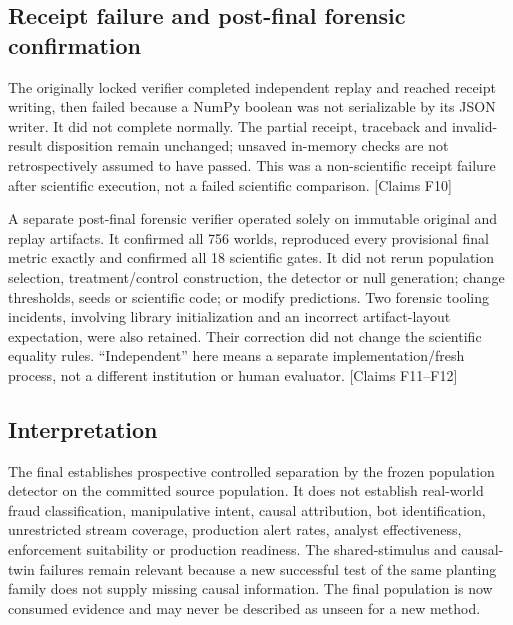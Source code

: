 \documentclass[11pt,letterpaper]{article}
\newcommand{\claims}[1]{{\small\textsf{[Claims #1]}}}
\begin{document}
\subsection{Receipt failure and post-final forensic confirmation}
The originally locked verifier completed independent replay and reached receipt writing, then failed because a NumPy boolean was not serializable by its JSON writer. It did not complete normally. The partial receipt, traceback and invalid-result disposition remain unchanged; unsaved in-memory checks are not retrospectively assumed to have passed. This was a non-scientific receipt failure after scientific execution, not a failed scientific comparison. \claims{F10}

A separate post-final forensic verifier operated solely on immutable original and replay artifacts. It confirmed all 756 worlds, reproduced every provisional final metric exactly and confirmed all 18 scientific gates. It did not rerun population selection, treatment/control construction, the detector or null generation; change thresholds, seeds or scientific code; or modify predictions. Two forensic tooling incidents, involving library initialization and an incorrect artifact-layout expectation, were also retained. Their correction did not change the scientific equality rules. ``Independent'' here means a separate implementation/fresh process, not a different institution or human evaluator. \claims{F11--F12}

\subsection{Interpretation}
The final establishes prospective controlled separation by the frozen population detector on the committed source population. It does not establish real-world fraud classification, manipulative intent, causal attribution, bot identification, unrestricted stream coverage, production alert rates, analyst effectiveness, enforcement suitability or production readiness. The shared-stimulus and causal-twin failures remain relevant because a new successful test of the same planting family does not supply missing causal information. The final population is now consumed evidence and may never be described as unseen for a new method.
\end{document}
